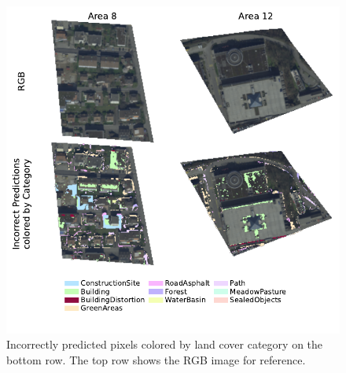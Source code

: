 \begin{figure}[H]
    \centering
    \captionsetup{width=0.8\linewidth}
    \includegraphics{figures/incorrect_per_category.pdf}
    \caption{Incorrectly predicted pixels colored by land cover category on the bottom row. The top row shows the RGB image for reference.}
    \label{fig:incorrect_per_category}
\end{figure}



